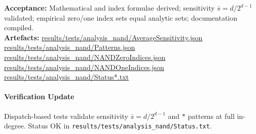 \documentclass{article}
\begin{document}
\textbf{Acceptance:} Mathematical and index formulae derived; sensitivity \(\bar{s}=d/2^{d-1}\) validated; empirical zero/one index sets equal analytic sets; documentation compiled.\\
\textbf{Artefacts:} \url{results/tests/analysis_nand/AverageSensitivity.json}\\
\url{results/tests/analysis_nand/Patterns.json}\\
\url{results/tests/analysis_nand/NANDZeroIndices.json}\\
\url{results/tests/analysis_nand/NANDOneIndices.json}\\
\url{results/tests/analysis_nand/Status*.txt}
\paragraph{Verification Update} Dispatch-based tests validate sensitivity \(\bar{s}=d/2^{d-1}\) and \(*\) patterns at full in-degree. Status OK in \texttt{results/tests/analysis\_nand/Status.txt}.
\end{document}
